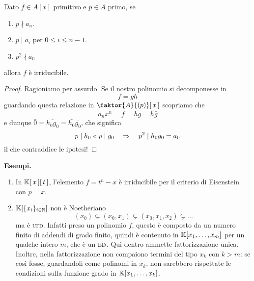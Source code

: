 \begin{multicols}{2}
\begin{theorem}
	Dato $ f \in A[x] $ primitivo e $ p \in A $ primo, se
	\begin{enumerate}
		\item  $ p \nmid a_n $.
		\item $ p \mid a_i $ per $ 0\leq i\leq n-1  $.
		\item $ p^2 \nmid a_0 $
	\end{enumerate}
	allora $ f $ è irriducibile.
\end{theorem}
\begin{proof}
	Ragioniamo per assurdo. Se il nostro polinomio si decomponesse in 
	\[ f = gh \]
	guardando questa relazione in $ \faktor{A}{(p)}[\,x\,] $ scopriamo che
	\[ a_nx^n = \bar{f} = \overline{hg} = \bar{h}\bar{g} \]
	e dunque $ \bar{0} = \overline{h_0g_0} = \bar{h_0}\bar{g_0} $, che significa
	\[ p \mid h_0 \text{ e } p \mid g_0 \quad\Rightarrow\quad p^2 \mid h_0g_0 = a_0 \]
	il che contraddice le ipotesi!
\end{proof}

\textbf{Esempi.}
\begin{enumerate}
	\item  In $ \mathbb{K}[\,x\,][\,t\,] $, l'elemento $ f = t^n - x $ è irriducibile per il criterio di Eisenstein con $ p = x $. 
	\item $ \mathbb{K}[\{x_i\}_{i \in \mathbb{N}}] $ non è Noetheriano
	\[ (x_0) \subsetneq (x_0, x_1) \subsetneq (x_0, x_1, x_2) \subsetneq \dots  \]
	ma è \textsc{ufd}. Infatti preso un polinomio $ f $, questo è composto da un numero finito di addendi di grado finito, quindi è contenuto in $ \mathbb{K}[x_1, \dots, x_m] $ per un qualche intero $ m $, che è un $ \textsc{ed} $. Qui dentro ammette fattorizzazione unica. Inoltre, nella fattorizzazione non compaiono termini del tipo $ x_k $ con $ k > m $: se così fosse, guardandoli come polinomi in $ x_k $, non sarebbero rispettate le condizioni sulla funzione grado in $ \mathbb{K}[x_1, \dots, x_k] $.
\end{enumerate}


\end{multicols}







